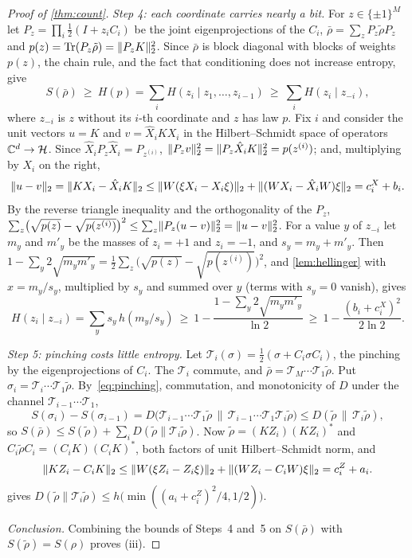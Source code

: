 \begin{proof}[Proof of \cref{thm:count}]
\emph{Step 4: each coordinate carries nearly a bit.} For $z\in\{\pm1\}^M$ let $P_z=\prod_i\frac12(I+z_iC_i)$ be the joint eigenprojections of
the $C_i$, $\bar\rho=\sum_zP_z\tilde\rho P_z$ and $p(z)=\operatorname{Tr}(P_z\tilde\rho)=\lVert P_zK\rVert_2^2$. Since $\bar\rho$ is block diagonal with blocks of
weights $p(z)$, the chain rule, and the fact that conditioning does not increase entropy, give
\[
S(\bar\rho)\ \ge\ H(p)=\sum_iH(z_i\mid z_1,\dots,z_{i-1})\ \ge\ \sum_iH(z_i\mid z_{-i}),
\]
where $z_{-i}$ is $z$ without its $i$-th coordinate and $z$ has law $p$. Fix $i$ and consider the unit vectors $u=K$ and
$v=\hat X_iKX_i$ in the Hilbert--Schmidt space of operators $\mathbb C^d\to\mathcal H$. Since $\hat X_iP_z\hat X_i=P_{z^{(i)}}$,
$\lVert P_zv\rVert_2^2=\lVert P_z\hat X_iK\rVert_2^2=p(z^{(i)})$; and, multiplying by $X_i$ on the right,
\[
\lVert u-v\rVert_2=\lVert KX_i-\hat X_iK\rVert_2\le\lVert W(\xi X_i-X_i\xi)\rVert_2+\lVert (WX_i-\hat X_iW)\xi\rVert_2=c^X_i+b_i .
\]
By the reverse triangle inequality and the orthogonality of the $P_z$,
$\sum_z\bigl(\sqrt{p(z)}-\sqrt{p(z^{(i)})}\bigr)^2\le\sum_z\lVert P_z(u-v)\rVert_2^2=\lVert u-v\rVert_2^2$. For a value $y$ of $z_{-i}$ let $m_y$ and $m'_y$ be
the masses of $z_i=+1$ and $z_i=-1$, and $s_y=m_y+m'_y$. Then
$1-\sum_y2\sqrt{m_ym'_y}=\frac12\sum_z\bigl(\sqrt{p(z)}-\sqrt{p(z^{(i)})}\bigr)^2$, and \cref{lem:hellinger} with $x=m_y/s_y$, multiplied
by $s_y$ and summed over $y$ (terms with $s_y=0$ vanish), gives
\[
H(z_i\mid z_{-i})=\sum_ys_y\,h(m_y/s_y)\ \ge\ 1-\frac{1-\sum_y2\sqrt{m_ym'_y}}{\ln2}\ \ge\ 1-\frac{(b_i+c^X_i)^2}{2\ln2}.
\]

\emph{Step 5: pinching costs little entropy.} Let $\mathcal T_i(\sigma)=\frac12(\sigma+C_i\sigma C_i)$, the pinching by the
eigenprojections of $C_i$. The $\mathcal T_i$ commute, and $\bar\rho=\mathcal T_M\cdots\mathcal T_1\tilde\rho$. Put
$\sigma_i=\mathcal T_i\cdots\mathcal T_1\tilde\rho$. By~\eqref{eq:pinching}, commutation, and monotonicity of $D$ under the channel
$\mathcal T_{i-1}\cdots\mathcal T_1$,
\[
S(\sigma_i)-S(\sigma_{i-1})=D\bigl(\mathcal T_{i-1}\cdots\mathcal T_1\tilde\rho\,\big\|\,\mathcal T_{i-1}\cdots\mathcal T_1\mathcal T_i\tilde\rho\bigr)
\le D(\tilde\rho\,\|\,\mathcal T_i\tilde\rho),
\]
so $S(\bar\rho)\le S(\tilde\rho)+\sum_iD(\tilde\rho\|\mathcal T_i\tilde\rho)$. Now $\tilde\rho=(KZ_i)(KZ_i)^*$ and
$C_i\tilde\rho C_i=(C_iK)(C_iK)^*$, both factors of unit Hilbert--Schmidt norm, and
\[
\lVert KZ_i-C_iK\rVert_2\le\lVert W(\xi Z_i-Z_i\xi)\rVert_2+\lVert (WZ_i-C_iW)\xi\rVert_2=c^Z_i+a_i .
\]
 gives $D(\tilde\rho\|\mathcal T_i\tilde\rho)\le h\bigl(\min((a_i+c^Z_i)^2/4,1/2)\bigr)$.

\emph{Conclusion.} Combining the bounds of Steps~4 and~5 on $S(\bar\rho)$ with $S(\tilde\rho)=S(\rho)$ proves (iii).
\end{proof}

